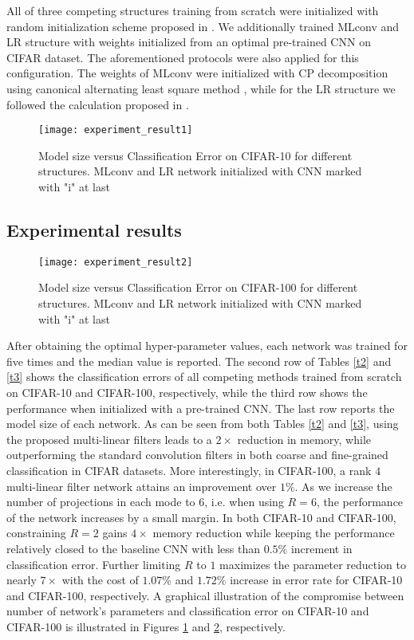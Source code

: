 \documentclass[conference,usletter]{IEEEtran}
\begin{document}
All of three competing structures training from scratch were initialized with random initialization scheme proposed in \cite{he2015delving}. We additionally trained MLconv and LR structure with weights initialized from an optimal pre-trained CNN on CIFAR dataset. The aforementioned protocols were also applied for this configuration. The weights of MLconv were initialized with CP decomposition using canonical alternating least square method \cite{kolda2009tensor}, while for the LR structure we followed the calculation proposed in \cite{tai2015convolutional}.

\begin{figure}[t!]
	\centering
	\texttt{[image: experiment\_result1]}
	\caption{Model size versus Classification Error on CIFAR-10 for different structures. MLconv and LR network initialized with CNN marked with "i" at last }\label{figure2}
\end{figure}

\subsection{Experimental results}

\begin{figure}[t!]
	\centering
	\texttt{[image: experiment\_result2]}
	\caption{Model size versus Classification Error on CIFAR-100 for different structures. MLconv and LR network initialized with CNN marked with "i" at last}\label{figure3}
\end{figure}

After obtaining the optimal hyper-parameter values, each network was trained for five times and the median value is reported. The second row of Tables \ref{t2} and \ref{t3} shows the classification errors of all competing methods trained from scratch on CIFAR-10 and CIFAR-100, respectively, while the third row shows the performance when initialized with a pre-trained CNN. The last row reports the model size of each network. As can be seen from both Tables \ref{t2} and \ref{t3}, using the proposed multi-linear filters leads to a $2\times$ reduction in memory, while outperforming the standard convolution filters in both coarse and fine-grained classification in CIFAR datasets. More interestingly, in CIFAR-100, a rank $4$ multi-linear filter network attains an improvement over $1\%$. As we increase the number of projections in each mode to $6$, i.e. when using $R=6$, the performance of the network increases by a small margin. In both CIFAR-10 and CIFAR-100, constraining $R=2$ gains $4\times$ memory reduction while keeping the performance relatively closed to the baseline CNN with less than $0.5\%$ increment in classification error. Further limiting $R$ to $1$ maximizes the parameter reduction to nearly $7\times$ with the cost of $1.07\%$ and $1.72\%$ increase in error rate for CIFAR-10 and CIFAR-100, respectively. A graphical illustration of the compromise between number of network's parameters and classification error on CIFAR-10 and CIFAR-100 is illustrated in Figures \ref{figure2} and \ref{figure3}, respectively.
\end{document}
